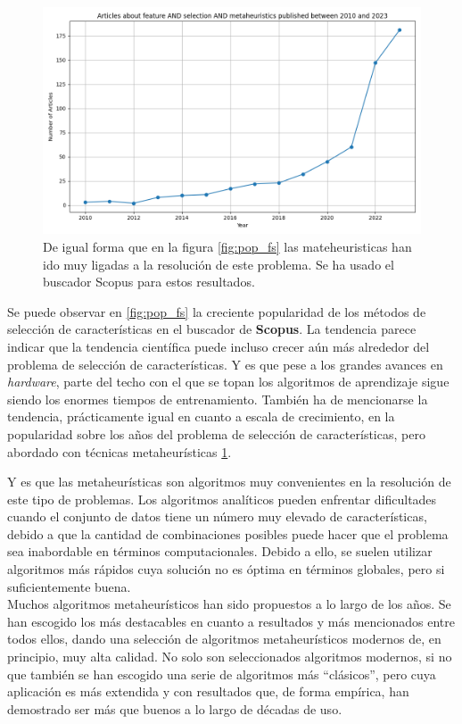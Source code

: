 \begin{figure}[htp]
  \begin{center}
    \includegraphics[width=1\textwidth]{imagenes/scopus_chart2.png}
  \end{center}
  \caption[Popularidad de feature selection + metaheuristics sobre los años]{De igual forma que en la figura \ref{fig:pop_fs} las mateheuristicas han ido muy ligadas a la resolución de este problema. Se ha usado el buscador Scopus para estos resultados.}
  \label{fig:pop_fs2}
\end{figure}

Se puede observar en \ref{fig:pop_fs} la creciente popularidad de los métodos de selección de características en el buscador de \textbf{Scopus}. La tendencia parece indicar que la tendencia científica puede incluso crecer aún más alrededor del problema de selección de características. Y es que pese a los grandes avances en \textit{hardware}, parte del techo con el que se topan los algoritmos de aprendizaje sigue siendo los enormes tiempos de entrenamiento.
También ha de mencionarse la tendencia, prácticamente igual en cuanto a escala de crecimiento, en la popularidad sobre los años del problema de selección de características, pero abordado con técnicas metaheurísticas \ref{fig:pop_fs2}.

Y es que las metaheurísticas son algoritmos muy convenientes en la resolución de este tipo de problemas. Los algoritmos analíticos pueden enfrentar dificultades cuando el conjunto de datos tiene un número muy elevado de características, debido a que la cantidad de combinaciones posibles puede hacer que el problema sea inabordable en términos computacionales. Debido a ello, se suelen utilizar algoritmos más rápidos cuya solución no es óptima en términos globales, pero si suficientemente buena.\\[6pt]
Muchos algoritmos metaheurísticos han sido propuestos a lo largo de los años. Se han escogido los más destacables en cuanto a resultados y más mencionados entre todos ellos, dando una selección de algoritmos metaheurísticos modernos de, en principio, muy alta calidad. No solo son seleccionados algoritmos modernos, si no que también se han escogido una serie de algoritmos más ``clásicos'', pero cuya aplicación es más extendida y con resultados que, de forma empírica, han demostrado ser más que buenos a lo largo de décadas de uso.

